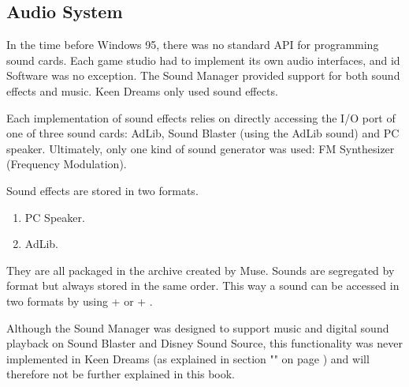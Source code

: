\documentclass[book.tex]{subfiles}
\begin{document}
\par
\begin{minipage}{\textwidth}
  
\end{minipage}
\label{time_ticks}


\subsection{Audio System}
In the time before Windows 95, there was no standard API for programming sound cards. Each game studio had to implement its own audio interfaces, and id Software was no exception. The Sound Manager provided support for both sound effects and music. Keen Dreams only used sound effects.\\

\par
\begin{minipage}{\textwidth}

\end{minipage}

\par
Each implementation of sound effects relies on directly accessing the I/O port of one of three sound cards: AdLib, Sound Blaster (using the AdLib sound) and PC speaker. Ultimately, only one kind of sound generator was used: FM Synthesizer (Frequency Modulation). \\

\par
Sound effects are stored in two formats.
\begin{enumerate}
\item PC Speaker.
\item AdLib.
\end{enumerate}

They are all packaged in the  archive created by Muse. Sounds are segregated by format but always stored in the same order. This way a sound can be accessed in two formats by using  +  or  + .\\



\begin{minipage}{\textwidth}

\end{minipage}

\par
Although the Sound Manager was designed to support music and digital sound playback on Sound Blaster and Disney Sound Source, this functionality was never implemented in Keen Dreams (as explained in section "" on page \pageref{section:audio}) and will therefore not be further explained in this book.\\
\end{document}
